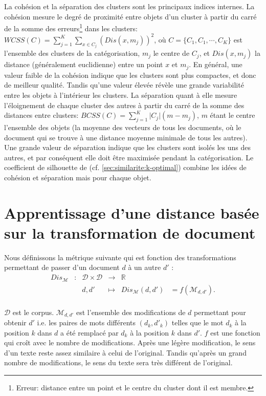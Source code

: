  La cohésion et la séparation des clusters sont les principaux indices internes. La cohésion mesure le degré de proximité entre objets d'un cluster à partir du carré de la somme des erreurs\footnote{Erreur: distance entre un point et le centre du cluster dont il est membre.} dans les clusters: $WCSS(C) = \sum\limits_{j=1}^K\sum\limits_{x \in C_j} (Dis(x, m_j))^2$, où $C = \lbrace C_1, C_1, \cdots, C_K \rbrace$ est l'ensemble des clusters de la catégorisation, $m_j$ le centre de $C_j$, et $Dis(x,m_j)$ la distance (généralement euclidienne) entre un point $x$ et $m_j$. En général, une valeur faible de la cohésion indique que les clusters sont plus compactes, et donc de meilleur qualité. Tandis qu'une valeur élevée révèle une grande variabilité entre les objets à l'intérieur les clusters. La séparation quant à elle mesure l'éloignement de chaque cluster des autres à partir du carré de la somme des distances entre clusters: $BCSS(C) = \sum\limits_{j = 1}^{K} \vert C_j \vert (m - m_j)$, 
  $m$ étant le centre l'ensemble des objets (la moyenne des vecteurs de tous les documents, où le document qui se trouve à une distance moyenne minimale de tous les autres). Une grande valeur de séparation indique que les clusters sont isolés les uns des autres, et par conséquent elle doit être maximisée pendant la catégorisation. Le coefficient de silhouette de \citet{rousseeuw1987silhouetteclusternumber} (cf. \ref{sec:similarite:k-optimal})  combine les idées de cohésion et séparation mais pour chaque objet.

\section{Apprentissage d'une distance basée sur la transformation de document}
Nous définissons la métrique suivante qui est fonction des transformations permettant de passer d'un document $d$ à un autre $d'$ :
\begin{equation}
\begin{array}{cccccc}
Dis_\mathcal{M} & : & \mathcal{D} \times \mathcal{D} & \to & \mathbb{R} & \\
& & d, d' & \mapsto & Dis_{\mathcal{M}}(d, d') & = f(\mathcal{M}_{d, d'}). \\
\end{array} \label{eq:similarite:distance-modif}
\end{equation}

$\mathcal{D}$ est le corpus. $\mathcal{M}_{d, d'}$ est l'ensemble des modifications de $d$ permettant pour obtenir $d'$ i.e. les paires de mots différents $(d_{k}, d'_{k})$ telles que le mot $d_{k}$ à la position $k$ dans $d$ a été remplacé par $d_{k}$ à la position $k$ dans $d'$. $f$ est une fonction qui croît avec le nombre de modifications. Après une légère modification, le sens d'un texte reste assez similaire à celui de l'original. Tandis qu'après un grand nombre de modifications, le sens du texte sera très différent de l'original. 

